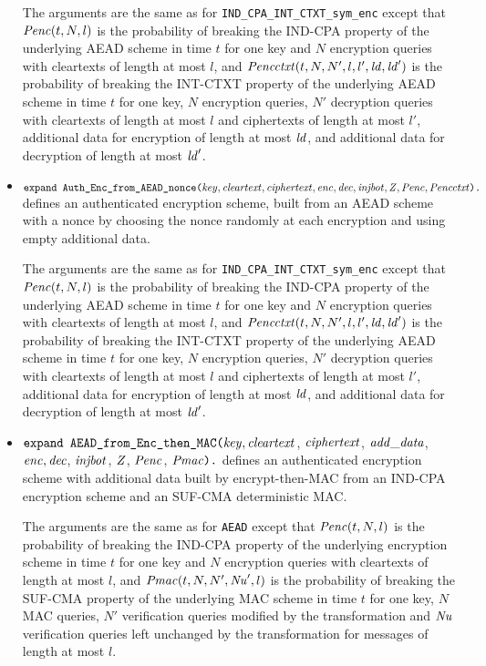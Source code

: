 \documentclass{article}
\begin{document}
\begin{itemize}
   The arguments are the same as for
   \texttt{IND\_CPA\_INT\_CTXT\_sym\_enc} except that $\mathit{Penc}(t, N,
   l)$ is the probability of breaking the IND-CPA property of the
   underlying AEAD scheme in time $t$ for one key and $N$ encryption
   queries with cleartexts of length at most $l$, and
   $\mathit{Pencctxt}(t, N, N', l, l', \mathit{ld}, \mathit{ld}')$ is the
   probability of breaking the INT-CTXT property of the underlying
   AEAD scheme in time $t$ for one key, $N$ encryption queries, $N'$
   decryption queries with cleartexts of length at most $l$ and
   ciphertexts of length at most $l'$, additional data for encryption
   of length at most $\mathit{ld}$, and additional data for decryption of
   length at most $\mathit{ld}'$.
   
 \item 
   $\texttt{expand\ Auth\_Enc\_from\_AEAD\_nonce(}\vn{key}, \vn{cleartext},
   \vn{ciphertext}, \vn{enc}, \vn{dec}, \vn{injbot}, \vn{Z},
   \vn{Penc}, \vn{Pencctxt}\texttt{).}$ defines an authenticated
   encryption scheme, built from an AEAD scheme with a nonce
   by choosing the nonce randomly at each encryption and
   using empty additional data.

   The arguments are the same as for
   \texttt{IND\_CPA\_INT\_CTXT\_sym\_enc} except that $\mathit{Penc}(t, N,
   l)$ is the probability of breaking the IND-CPA property of the
   underlying AEAD scheme in time $t$ for one key and $N$ encryption
   queries with cleartexts of length at most $l$, and
   $\mathit{Pencctxt}(t, N, N', l, l', \mathit{ld}, \mathit{ld}')$ is the
   probability of breaking the INT-CTXT property of the underlying
   AEAD scheme in time $t$ for one key, $N$ encryption queries, $N'$
   decryption queries with cleartexts of length at most $l$ and
   ciphertexts of length at most $l'$, additional data for encryption
   of length at most $\mathit{ld}$, and additional data for decryption of
   length at most $\mathit{ld}'$.

\item $\texttt{expand AEAD\_from\_Enc\_then\_MAC(}\mathit{key},
  \mathit{cleartext}$, $\mathit{ciphertext}$, $\mathit{add\_data}$, $\mathit{enc},
  \mathit{dec}$, $\mathit{injbot}$, $\mathit{Z}$, $\mathit{Penc}$, $\mathit{Pmac}\texttt{).}$ defines an
authenticated encryption scheme with additional data built by encrypt-then-MAC from an IND-CPA encryption scheme and an SUF-CMA deterministic MAC.

The arguments are the same as for \texttt{AEAD} except that $\mathit{Penc}(t, N, l)$ is the probability of breaking the IND-CPA
  property of the underlying encryption scheme in time $t$ for one key and $N$ encryption queries with
  cleartexts of length at most $l$, and
  $\mathit{Pmac}(t, N, N', \mathit{Nu}', l)$ is the probability of breaking the SUF-CMA
   property of the underlying MAC scheme in time $t$ for one key, $N$ MAC queries, $N'$ verification
   queries modified by the transformation and $\mathit{Nu}$ verification
   queries left unchanged by the transformation for messages of length at most $l$.


\end{itemize}
\end{document}
